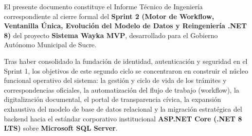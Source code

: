 \documentclass[a4paper,12pt]{article}
\newcommand{\dotnet}{\mbox{.NET}}
\begin{document}
El presente documento constituye el Informe Técnico de Ingeniería correspondiente al cierre formal del \textbf{Sprint 2 (Motor de Workflow, Ventanilla Única, Evolución del Modelo de Datos y Reingeniería \dotnet{} 8)} del proyecto \textbf{Sistema Wayka MVP}, desarrollado para el Gobierno Autónomo Municipal de Sucre.

Tras haber consolidado la fundación de identidad, autenticación y seguridad en el Sprint 1, los objetivos de este segundo ciclo se concentraron en construir el núcleo funcional operativo del sistema: la gestión y ciclo de vida de los trámites y correspondencias oficiales, la automatización del flujo de trabajo (workflow), la digitalización documental, el portal de transparencia cívica, la expansión exhaustiva del modelo de base de datos relacional y la migración estratégica del backend hacia el estándar corporativo institucional \textbf{ASP\dotnet{} Core (\dotnet{} 8 LTS)} sobre \textbf{Microsoft SQL Server}.
\end{document}
